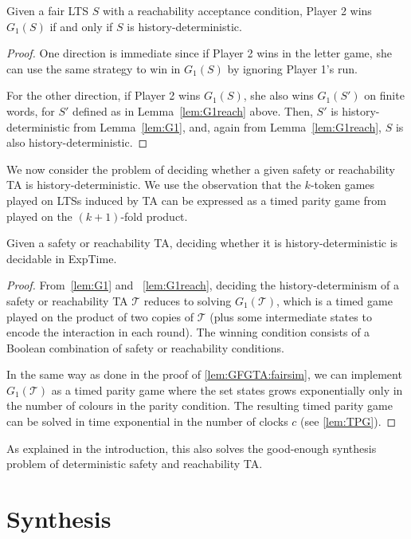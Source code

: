 \documentclass[10pt,a4paper]{amsart}
\theoremstyle{definition}
\numberwithin{equation}{section}
\newcommand{\T}{\mathcal{T}}
\newcommand{\exptime}{\EXPTIME}
\newcommand{\lts}{S}
\newcommand{\EXPTIME}{{\sc ExpTime}}
\begin{document}
\begin{theorem}
Given a fair LTS $\lts$ with a reachability acceptance condition, Player 2 wins $G_1(\lts)$ if and only if $\lts$ is history-deterministic. 
\end{theorem}

\begin{proof}
One direction is immediate since if Player 2 wins in the letter game, she can use the same strategy to win in $G_1(\lts)$ by ignoring Player 1's run.

For the other direction, if Player 2 wins $G_1(\lts)$, she also wins $G_1(\lts')$ on finite words, for $\lts'$ defined as in Lemma~\ref{lem:G1reach} above. Then, $\lts'$ is history-deterministic from Lemma~\ref{lem:G1}, and, again from Lemma~\ref{lem:G1reach}, $\lts$ is also history-deterministic.
\end{proof}


We now consider the problem of deciding whether a given safety or reachability TA
is history-deterministic. We use the observation that
the $k$-token games played on LTSs induced by TA can be expressed as a timed parity game from~\cite{CHP08} played on the $(k+1)$-fold product.


\begin{theorem}\label{thm:decidable}
Given a safety or reachability TA, deciding whether it is history-deterministic is decidable in \exptime.
\end{theorem}
\begin{proof}
From~\cref{lem:G1} and ~\cref{lem:G1reach}, deciding the history-determinism of a safety or reachability TA $\T$ reduces to solving $G_1(\T)$, which is a timed game played on the product of two copies of $\T$ (plus some intermediate states to encode the interaction in each round). The winning condition consists of a Boolean combination of safety or reachability conditions.

In the same way as done in the proof of \cref{lem:GFGTA:fairsim}, we can implement $G_1(\T)$ as a timed parity
game where the set states grows exponentially only in the number of colours in the parity condition.
The resulting timed parity game can be solved in time exponential in the number of clocks $c$ (see
\cref{lem:TPG}).
\end{proof}

As explained in the introduction, this also solves the good-enough synthesis problem of deterministic safety and reachability TA.
	
	
	\section{Synthesis}
	\label{sec_synthesis}
	\label{sec:synthesis}
\end{document}
